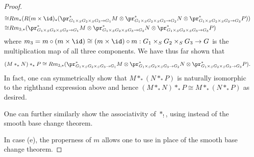 \begin{proof}
\begin{align*}
        \cong & Rm_* (  R(m \times \id)_* ( \pr_{G_1 \times_S G_2 \times_S G_3 \to G_1}^* M \otimes \pr_{G_1 \times_S G_2 \times_S G_3 \to G_2}^* N  \otimes \pr_{G_1 \times_S G_2 \times_S G_3 \to G_3}^* P)) \\
        \cong & Rm_{3,*} ( \pr_{G_1 \times_S G_2 \times_S G_3 \to G_1}^* M \otimes \pr_{G_1 \times_S G_2 \times_S G_3 \to G_2}^* N  \otimes \pr_{G_1 \times_S G_2 \times_S G_3 \to G_3}^* P)
    \end{align*}
    where $m_3 = m \circ (m \times \id) \cong (m \times \id) \circ m: G_1 \times_S G_2 \times_S G_3 \to G$ is the multiplication map of all three components. We have thus far shown that
    $$(M *_* N) *_* P \cong Rm_{3,*} ( \pr_{G_1 \times_S G_2 \times_S G_3 \to G_1}^* M \otimes \pr_{G_1 \times_S G_2 \times_S G_3 \to G_2}^* N  \otimes \pr_{G_1 \times_S G_2 \times_S G_3 \to G_3}^* P).$$
    In fact, one can symmetrically show that $M *_* (N *_* P)$ is naturally isomorphic to the righthand expression above and hence $(M *_* N) *_* P \cong M *_* (N *_* P)$ as desired.

    One can further similarly show the associativity of $*_!$, using  instead of the smooth base change theorem.

    In case (e), the properness of $m$ allows one to use  in place of the smooth base change theorem.
\end{proof}